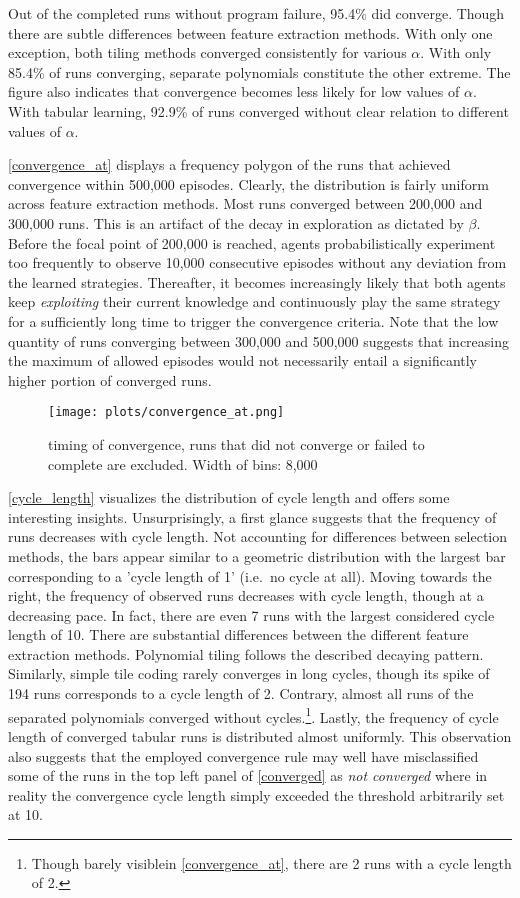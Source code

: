 Out of the completed runs without program failure, 95.4\% did converge. Though there are subtle differences between feature extraction methods. With only one exception, both tiling methods converged consistently for various $\alpha$. With only 85.4\% of runs converging, separate polynomials constitute the other extreme. The figure also indicates that convergence becomes less likely for low values of $\alpha$. With tabular learning, 92.9\% of runs converged without clear relation to different values of $\alpha$.

\autoref{convergence_at} displays a frequency polygon of the runs that achieved convergence within 500,000 episodes. Clearly, the distribution is fairly uniform across feature extraction methods. Most runs converged between 200,000 and 300,000 runs. This is an artifact of the decay in exploration as dictated by $\beta$. Before the focal point of 200,000 is reached, agents probabilistically experiment too frequently to observe 10,000 consecutive episodes without any deviation from the learned strategies. Thereafter, it becomes increasingly likely that both agents keep \emph{exploiting} their current knowledge and continuously play the same strategy for a sufficiently long time to trigger the convergence criteria. Note that the low quantity of runs converging between 300,000 and 500,000 suggests that increasing the maximum of allowed episodes would not necessarily entail a significantly higher portion of converged runs.

\begin{figure}
	\texttt{[image: plots/convergence\_at.png]}
	\caption{timing of convergence, runs that did not converge or failed to complete are excluded. Width of bins: 8,000}
	\label{convergence_at}
\end{figure}

\autoref{cycle_length} visualizes the distribution of cycle length and offers some interesting insights. Unsurprisingly, a first glance suggests that the frequency of runs decreases with cycle length. Not accounting for differences between selection methods, the bars appear similar to a geometric distribution with the largest bar corresponding to a 'cycle length of 1' (i.e.\ no cycle at all). Moving towards the right, the frequency of observed runs decreases with cycle length, though at a decreasing pace. In fact, there are even 7 runs with the largest considered cycle length of 10. There are substantial differences between the different feature extraction methods. Polynomial tiling follows the described decaying pattern. Similarly, simple tile coding rarely converges in long cycles, though its spike of 194 runs corresponds to a cycle length of 2. Contrary, almost all runs of the separated polynomials converged without cycles.\footnote{Though barely visiblein \autoref{convergence_at}, there are 2 runs with a cycle length of 2.}. Lastly, the frequency of cycle length of converged tabular runs is distributed almost uniformly. This observation also suggests that the employed convergence rule may well have misclassified some of the runs in the top left panel of \autoref{converged} as \emph{not converged} where in reality the convergence cycle length simply exceeded the threshold arbitrarily set at 10. 

